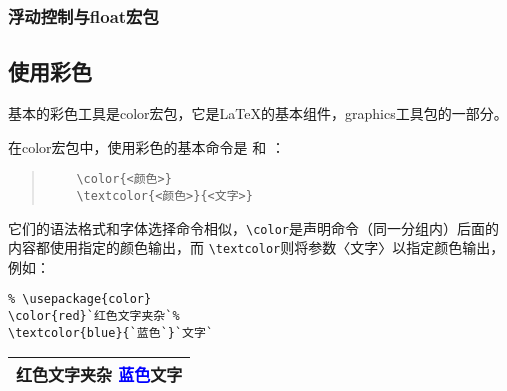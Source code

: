 \subsubsection{浮动控制与float宏包}




\subsection{使用彩色}
基本的彩色工具是color宏包，它是\LaTeX 的基本组件，graphics工具包的一部分。

在color宏包中，使用彩色的基本命令是 {\color{blue}{\verb|\colr|}} 和 {\color{blue}{\verb|\textcolor|}} ：
\begin{quote} %
	\begin{verbatim}
	\color{<颜色>}
	\textcolor{<颜色>}{<文字>}
	\end{verbatim}  %
\end{quote} 
\noindent 它们的语法格式和字体选择命令相似，\verb|\color|是声明命令（同一分组内）后面的内容都使用指定的颜色输出，而 \verb|\textcolor|则将参数〈文字〉以指定颜色输出，例如：
\begin{table}[h]
	\begin{minipage}{0.5\linewidth}
		\begin{lstlisting}
% \usepackage{color}
\color{red}`红色文字夹杂`%
\textcolor{blue}{`蓝色`}`文字`
		\end{lstlisting}
	\end{minipage}
	\quad
	\begin{tabular}{|l|}
		\hline
		\color{red}红色文字夹杂%
		\textcolor{blue}{蓝色}文字\\
		\hline
	\end{tabular}
\end{table}